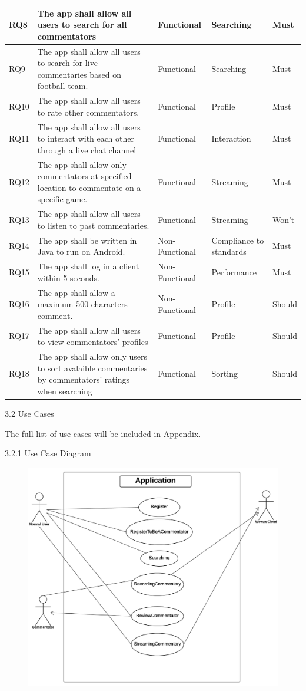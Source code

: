 \documentclass{article}
\begin{document}
\begin{flushleft}
\begin{longtable}[t]{| p{1cm} | p{6cm} | p{1.8cm} | p{2cm} | p{1.2cm} |}
RQ8 & The app shall allow all users to search for all commentators & Functional & Searching & Must\\
\hline
RQ9 & The app shall allow all users to search for live commentaries based on football team. & Functional & Searching & Must\\
\hline
RQ10 & The app shall allow all users to rate other commentators. & Functional & Profile & Must\\
\hline
RQ11 & The app shall allow all users to interact with each other through a live chat channel & Functional & Interaction & Must\\
\hline
RQ12 & The app shall allow only commentators at specified location to commentate on a specific game. & Functional & Streaming & Must\\
\hline
RQ13 & The app shall allow all users to listen to past commentaries. & Functional & Streaming & Won't\\
\hline
RQ14 & The app shall be written in Java to run on Android. & Non-Functional & Compliance to standards & Must\\
\hline
RQ15 & The app shall log in a client within 5 seconds. & Non-Functional & Performance & Must\\
\hline
RQ16 & The app shall allow a maximum 500 characters comment. & Non-Functional & Profile & Should\\
\hline
RQ17 & The app shall allow all users to view commentators' profiles & Functional & Profile & Should\\
\hline
RQ18 & The app shall allow only users to sort avalaible commentaries by commentators' ratings when searching & Functional & Sorting & Should\\
\hline
\end{longtable}
{\Large 3.2 Use Cases}\par
The full list of use cases will be included in Appendix.\par
{\large 3.2.1 Use Case Diagram}\par
\begin{figure}[H]
    \centering
    \includegraphics[width=14cm]{use-case-diagram}

\end{figure}
\end{flushleft}
\end{document}
